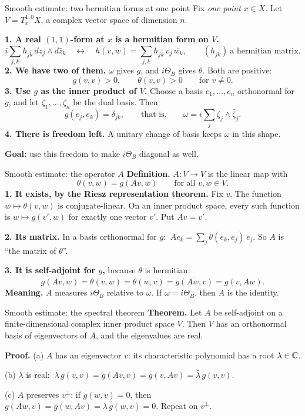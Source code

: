 \begin{frame}{Smooth estimate: two hermitian forms at one point}
\label{fr:kv-proof-two-hermitian-20}
Fix \emph{one point} \(x\in X\). Let \(V=T^{1,0}_xX\), a complex vector space of dimension \(n\).
\par\medskip
\textbf{1. A real \((1,1)\)-form at \(x\) is a hermitian form on \(V\).}
\[
i\sum_{j,k}h_{j\bar k}\,dz_j\wedge d\bar z_k
\quad\longleftrightarrow\quad
h(v,w)=\sum_{j,k}h_{j\bar k}\,v_j\,\overline{w_k},
\qquad (h_{j\bar k})\ \text{a hermitian matrix.}
\]
\textbf{2. We have two of them.} \(\omega\) gives \(g\), and \(i\Theta_B\) gives \(\theta\). Both are positive:
\[
g(v,v)>0,\qquad \theta(v,v)>0\qquad\text{for } v\ne0 .
\]
\textbf{3. Use \(g\) as the inner product of \(V\).} Choose a basis \(e_1,\ldots,e_n\) orthonormal for \(g\), and let \(\zeta_1,\ldots,\zeta_n\) be the dual basis. Then
\[
g(e_j,e_k)=\delta_{jk},
\qquad\text{that is,}\qquad
\omega=i\sum_j\zeta_j\wedge\bar\zeta_j .
\]
\textbf{4. There is freedom left.} A unitary change of basis keeps \(\omega\) in this shape.
\par
\textbf{Goal:} use this freedom to make \(i\Theta_B\) diagonal as well.
\end{frame}

\begin{frame}{Smooth estimate: the operator \(A\)}
\textbf{Definition.} \(A:V\to V\) is the linear map with
\[
\theta(v,w)=g(Av,w)\qquad\text{for all } v,w\in V .
\]
\textbf{1. It exists, by the Riesz representation theorem.} Fix \(v\). The function \(w\mapsto\theta(v,w)\) is conjugate-linear. On an inner product space, every such function is \(w\mapsto g(v',w)\) for exactly one vector \(v'\). Put \(Av=v'\).
\par\medskip
\textbf{2. Its matrix.} In a basis orthonormal for \(g\):
\(\ Ae_k=\sum_j\theta(e_k,e_j)\,e_j\).
So \(A\) is ``the matrix of \(\theta\)''.
\par\medskip
\textbf{3. It is self-adjoint for \(g\),} because \(\theta\) is hermitian:
\[
g(Av,w)=\theta(v,w)=\overline{\theta(w,v)}=\overline{g(Aw,v)}=g(v,Aw).
\]
\textbf{Meaning.} \(A\) measures \(i\Theta_B\) relative to \(\omega\). If \(\omega=i\Theta_B\), then \(A\) is the identity.
\end{frame}

\begin{frame}{Smooth estimate: the spectral theorem}
\textbf{Theorem.} Let \(A\) be self-adjoint on a finite-dimensional complex inner product space \(V\).
Then \(V\) has an orthonormal basis of eigenvectors of \(A\), and the eigenvalues are real.
\par\medskip
\textbf{Proof.}
(a) \(A\) has an eigenvector \(v\): its characteristic polynomial has a root \(\lambda\in\mathbb C\).
\par
(b) \(\lambda\) is real:
\(\ \lambda\,g(v,v)=g(Av,v)=g(v,Av)=\bar\lambda\,g(v,v)\).
\par
(c) \(A\) preserves \(v^\perp\): if \(g(w,v)=0\), then \(g(Aw,v)=g(w,Av)=\lambda\,g(w,v)=0\). Repeat on \(v^\perp\).
\end{frame}

